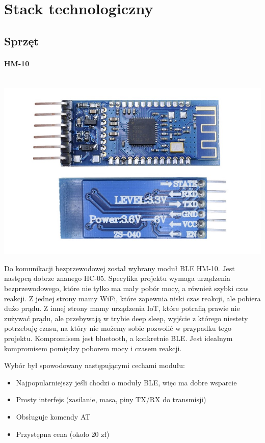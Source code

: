 \documentclass[eng,printmode]{mgr}
\begin{document}
\pagebreak
\section {Stack technologiczny}

\subsection{Sprzęt}
\paragraph{HM-10}\mbox{} \\
\includegraphics[width=\textwidth]{hm-10}

Do komunikacji bezprzewodowej został wybrany moduł BLE HM-10. Jest następcą dobrze znanego HC-05. Specyfika projektu wymaga urządzenia bezprzewodowego, które nie tylko ma mały pobór mocy, a również szybki czas reakcji. Z jednej strony mamy WiFi, które zapewnia niski czas reakcji, ale pobiera dużo prądu. Z innej strony mamy urządzenia IoT, które potrafią prawie nie zużywać prądu, ale przebywają w trybie deep sleep, wyjście z którego niestety potrzebuję czasu, na który nie możemy sobie pozwolić w przypadku tego projektu. Kompromisem jest bluetooth, a konkretnie BLE. Jest idealnym kompromisem pomiędzy poborem mocy i czasem reakcji.

Wybór był spowodowany następującymi cechami modułu:
\begin{itemize}
\item Najpopularniejszy jeśli chodzi o moduły BLE, więc ma dobre wsparcie
\item Prosty interfejs (zasilanie, masa, piny TX/RX do transmisji)
\item Obsługuje komendy AT
\item Przystępna cena (około 20 zł)
\end{itemize}
\end{document}
